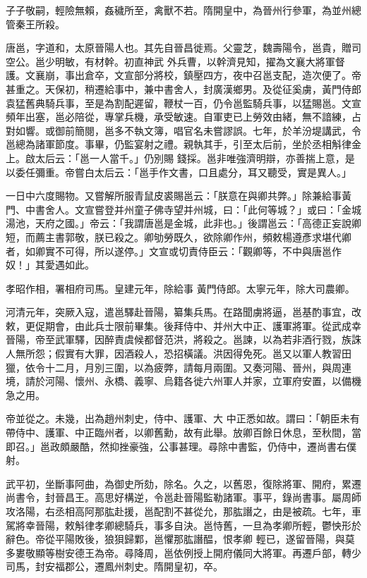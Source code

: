 \begin{pinyinscope}
 子子敬嗣，輕險無賴，姦穢所至，禽獸不若。隋開皇中，為晉州行參軍，為並州總管秦王所殺。



 唐邕，字道和，太原晉陽人也。其先自晉昌徙焉。父靈芝，魏壽陽令，邕貴，贈司空公。邕少明敏，有材幹。初直神武
 外兵曹，以幹濟見知，擢為文襄大將軍督護。文襄崩，事出倉卒，文宣部分將校，鎮壓四方，夜中召邕支配，造次便了。帝甚重之。天保初，稍遷給事中，兼中書舍人，封廣漢鄉男。及從征奚虜，黃門侍郎袁猛舊典騎兵事，至是為割配遲留，鞭杖一百，仍令邕監騎兵事，以猛賜邕。文宣頻年出塞，邕必陪從，專掌兵機，承受敏速。自軍吏已上勞效由緒，無不諳練，占對如響。或御前簡閱，邕多不執文簿，唱官名未嘗謬誤。七年，於羊汾堤講武，令邕總為諸軍節度。事畢，仍監宴射之禮。親執其手，引至太后前，坐於丞相斛律金上。啟太后云：「邕一人當千。」仍別賜
 錢採。邕非唯強濟明辯，亦善揣上意，是以委任彌重。帝嘗白太后云：「邕手作文書，口且處分，耳又聽受，實是異人。」



 一日中六度賜物。又嘗解所服青鼠皮裘賜邕云：「朕意在與卿共弊。」除兼給事黃門、中書舍人。文宣嘗登并州童子佛寺望并州城，曰：「此何等城？」或曰：「金城湯池，天府之國。」帝云：「我謂唐邕是金城，此非也。」後謂邕云：「高德正妄說卿短，而薦主書郭敬，朕已殺之。卿劬勞既久，欲除卿作州，頻敕楊遵彥求堪代卿者，如卿實不可得，所以遂停。」文宣或切責侍臣云：「觀卿等，不中與唐邕作奴！」其愛遇如此。



 孝昭作相，署相府司馬。皇建元年，除給事
 黃門侍郎。太寧元年，除大司農卿。



 河清元年，突厥入寇，遣邕驛赴晉陽，纂集兵馬。在路聞虜將逼，邕基酌事宜，改敕，更促期會，由此兵士限前畢集。後拜侍中、并州大中正、護軍將軍。從武成幸晉陽，帝至武軍驛，因醉責虞候都督范洪，將殺之。邕諫，以為若非酒行戮，族誅人無所怨；假實有大罪，因酒殺人，恐招橫議。洪因得免死。邕又以軍人教習田獵，依令十二月，月別三圍，以為疲弊，請每月兩圍。又奏河陽、晉州，與周連境，請於河陽、懷州、永橋、義寧、烏籍各徙六州軍人并家，立軍府安置，以備機急之用。



 帝並從之。未幾，出為趙州刺史，侍中、護軍、大
 中正悉如故。謂曰：「朝臣未有帶侍中、護軍、中正臨州者，以卿舊勳，故有此舉。放卿百餘日休息，至秋間，當即召。」邕政頗嚴酷，然抑挫豪強，公事甚理。尋除中書監，仍侍中，遷尚書右僕射。



 武平初，坐斷事阿曲，為御史所劾，除名。久之，以舊恩，復除將軍、開府，累遷尚書令，封晉昌王。高思好構逆，令邕赴晉陽監勒諸軍。事平，錄尚書事。屬周師攻洛陽，右丞相高阿那肱赴援，邕配割不甚從允，那肱譖之，由是被疏。七年，車駕將幸晉陽，敕斛律孝卿總騎兵，事多自決。邕恃舊，一旦為孝卿所輕，鬱怏形於辭色。帝從平陽敗後，狼狽歸鄴，邕懼那肱譖醖，恨孝卿
 輕已，遂留晉陽，與莫多婁敬顯等樹安德王為帝。尋降周，邕依例授上開府儀同大將軍。再遷戶部，轉少司馬，封安福郡公，遷鳳州刺史。隋開皇初，卒。




\end{pinyinscope}
